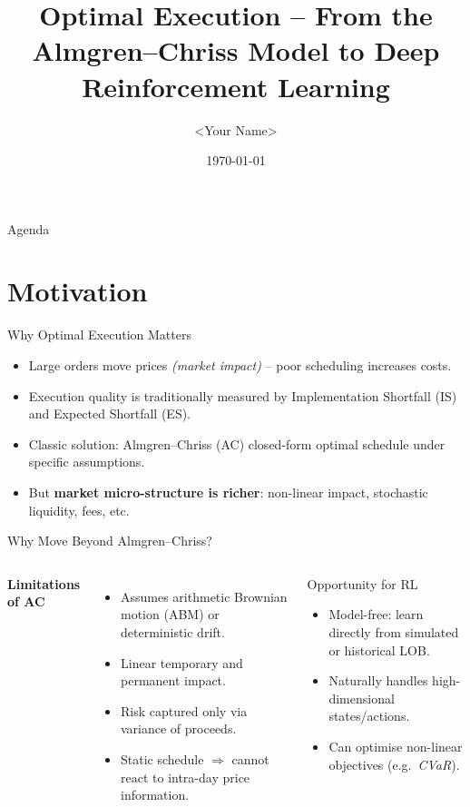 \documentclass[11pt]{beamer}
\title[Optimal Execution via RL]{Optimal Execution – From the Almgren--Chriss Model to Deep Reinforcement Learning}
\author{<Your Name>}
\institute{<Your Institution>}
\date{\today}
\begin{document}
	
	\begin{frame}[plain]
		\titlepage
	\end{frame}
	
	\begin{frame}{Agenda}
		\tableofcontents
	\end{frame}
	
	\section{Motivation}
	
	\begin{frame}{Why Optimal Execution Matters}
		\begin{itemize}
			\item Large orders move prices \textit{(market impact)} -- poor scheduling increases costs.
			\item Execution quality is traditionally measured by Implementation Shortfall (IS) and Expected Shortfall (ES).
			\item Classic solution: \alert{Almgren--Chriss (AC)} closed-form optimal schedule under specific assumptions.
			\item But \textbf{market micro-structure is richer}: non-linear impact, stochastic liquidity, fees, etc.
		\end{itemize}
	\end{frame}
	
	\begin{frame}{Why Move Beyond Almgren--Chriss?}
		\begin{columns}[T]
			\textbf{Limitations of AC}
			\begin{itemize}
				\item Assumes arithmetic Brownian motion (ABM) or deterministic drift.
				\item Linear temporary and permanent impact.
				\item Risk captured only via variance of proceeds.
				\item Static schedule $\Rightarrow$ cannot react to intra-day price information.
			\end{itemize}
			\vspace{-0.3cm}
			\begin{block}{Opportunity for RL}
				\begin{itemize}
					\item Model-free: learn directly from simulated or historical LOB.
					\item Naturally handles high-dimensional states/actions.
					\item Can optimise non-linear objectives (e.g.\ \textit{CVaR}).
				\end{itemize}
			\end{block}
		\end{columns}
	\end{frame}
	
\end{document}
